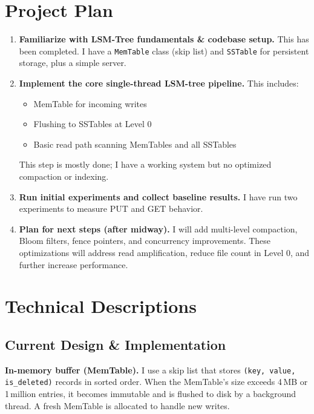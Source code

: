\documentclass[10pt]{article}
\begin{document}
\section{Project Plan}
\begin{enumerate}
    \item \textbf{Familiarize with LSM-Tree fundamentals \& codebase setup.} 
    This has been completed. I have a \texttt{MemTable} class (skip list) and \texttt{SSTable} for persistent storage, plus a simple server.

    \item \textbf{Implement the core single-thread LSM-tree pipeline.} 
    This includes:
    \begin{itemize}
        \item MemTable for incoming writes
        \item Flushing to SSTables at Level 0
        \item Basic read path scanning MemTables and all SSTables
    \end{itemize}
    This step is mostly done; I have a working system but no optimized compaction or indexing.

    \item \textbf{Run initial experiments and collect baseline results.} 
    I have run two experiments to measure PUT and GET behavior.

    \item \textbf{Plan for next steps (after midway).} 
    I will add multi-level compaction, Bloom filters, fence pointers, and concurrency improvements. These optimizations will address read amplification, reduce file count in Level 0, and further increase performance.
\end{enumerate}

\section{Technical Descriptions}

\subsection{Current Design \& Implementation}
\textbf{In-memory buffer (MemTable).}
I use a skip list that stores \texttt{(key, value, is\_deleted)} records in sorted order. 
When the MemTable's size exceeds 4\,MB or 1\,million entries, it becomes immutable and is flushed to disk by a background thread. 
A fresh MemTable is allocated to handle new writes.
\end{document}
